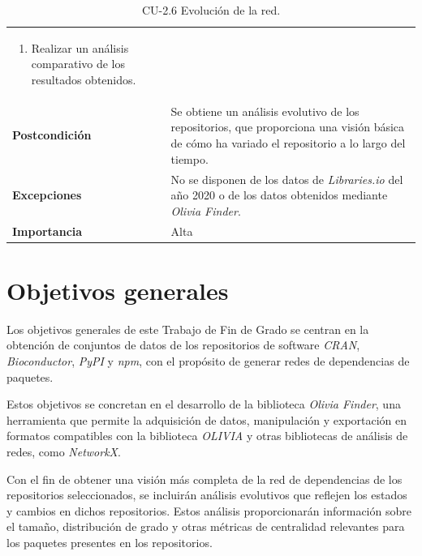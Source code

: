 \begin{table}[p]
\begin{tabularx}{\linewidth}{ p{} p{} }
\begin{enumerate}
			                                \item Realizar un análisis comparativo de los resultados obtenidos.
		                                \end{enumerate}                                                              \\
		\textbf{Postcondición}        & Se obtiene un análisis evolutivo de los repositorios, que proporciona una visión básica de cómo ha variado el repositorio a lo largo del tiempo.                                          \\
		\textbf{Excepciones}          & No se disponen de los datos de \textit{Libraries.io} del año 2020 o de los datos obtenidos mediante \textit{Olivia Finder}.                                                               \\
		\textbf{Importancia}          & Alta                                                                                                                                                                                      \\
		\bottomrule
	\end{tabularx}
	\caption{CU-2.6 Evolución de la red.}
	\label{tab:cu2.6}
\end{table}


\section{Objetivos generales}

Los objetivos generales de este Trabajo de Fin de Grado se centran en la obtención de conjuntos de
datos de los repositorios de software \textit{CRAN}, \textit{Bioconductor}, \textit{PyPI} y \textit{npm},
con el propósito de generar redes de dependencias de paquetes.

Estos objetivos se concretan en el desarrollo de la biblioteca \textit{Olivia Finder}, una herramienta
que permite la adquisición de datos, manipulación y exportación en formatos compatibles con la
biblioteca \textit{OLIVIA} y otras bibliotecas de análisis de redes, como \textit{NetworkX}.

Con el fin de obtener una visión más completa de la red de dependencias de los repositorios
seleccionados, se incluirán análisis evolutivos que reflejen los estados y cambios en dichos repositorios.
Estos análisis proporcionarán información sobre el tamaño, distribución de grado y otras métricas de
centralidad relevantes para los paquetes presentes en los repositorios.

